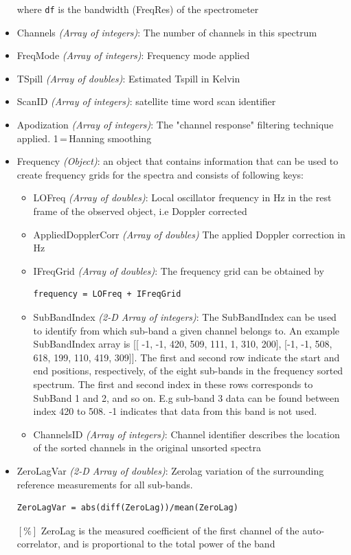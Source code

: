 \begin{itemize}
                         where {\tt df} is the bandwidth (FreqRes) of the spectrometer
  \item Channels \emph{(Array of integers)}: The number of channels in this spectrum
  \item FreqMode \emph{(Array of integers)}: Frequency mode applied
  \item TSpill \emph{(Array of doubles)}: Estimated Tspill in Kelvin
  \item ScanID \emph{(Array of integers)}: satellite time word scan identifier
  \item Apodization \emph{(Array of integers)}: The "channel response" filtering technique applied. 1\,=\,Hanning smoothing  
  \item Frequency \emph{(Object)}: an object that contains information that can be used to create frequency grids for the spectra
                       and consists of following keys: 
  \begin{itemize}             
      \item LOFreq \emph{(Array of doubles)}: Local oscillator frequency in Hz in the rest frame of the
                       observed object, i.e Doppler corrected
      \item AppliedDopplerCorr \emph{(Array of doubles)} The applied Doppler correction in Hz
      \item IFreqGrid \emph{(Array of doubles)}: The frequency grid can be obtained by
                       \begin{verbatim}frequency = LOFreq + IFreqGrid\end{verbatim}
      \item SubBandIndex \emph{(2-D Array of integers)}: The SubBandIndex 
                       can be used to identify from which sub-band a given channel belongs to.
                       An example SubBandIndex array is [[ -1, -1, 420, 509, 111, 1, 310, 200],
                       [-1, -1, 508, 618, 199, 110, 419, 309]].
                       The first and second row indicate the start and end positions, respectively,
                       of the eight sub-bands in the frequency sorted spectrum.
                       The first and second index in these rows corresponds to SubBand 1 and 2, and so
                       on. E.g sub-band 3 data can be found between index 420 to 508.
                       -1 indicates that data from this band is not used.
     \item ChannelsID \emph{(Array of integers)}: Channel identifier describes the location
                       of the sorted channels in the original unsorted spectra
  \end{itemize} 
  \item ZeroLagVar \emph{(2-D Array of doubles)}: Zerolag variation of the surrounding reference measurements for all sub-bands.
                       \begin{verbatim}ZeroLagVar = abs(diff(ZeroLag))/mean(ZeroLag)\end{verbatim} \([\%]\)
                        ZeroLag is the measured coefficient of the first channel of the auto-correlator,
                        and is proportional to the total power of the band
\end{itemize}

